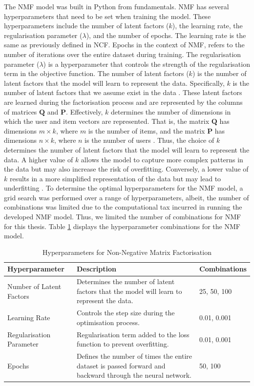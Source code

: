 The NMF model was built in Python from fundamentals. NMF has several hyperparameters that need to be set when training the model. These hyperparameters include the number of latent factors ($k$), the learning rate, the regularisation parameter ($\lambda$), and the number of epochs. The learning rate is the same as previously defined in NCF. Epochs in the context of NMF, refers to the number of iterations over the entire dataset during training. The regularisation parameter ($\lambda$) is a hyperparameter that controls the strength of the regularisation term in the objective function. The number of latent factors ($k$) is the number of latent factors that the model will learn to represent the data. Specifically, $k$ is the number of latent factors that we assume exist in the data \cite{lee2000algorithms}. These latent factors are learned during the factorisation process and are represented by the columns of matrices $\mathbf{Q}$ and $\mathbf{P}$. Effectively, $k$ determines the number of dimensions in which the user and item vectors are represented. That is, the matrix $\mathbf{Q}$ has dimensions $m \times k$, where $m$ is the number of items, and the matrix $\mathbf{P}$ has dimensions $n \times k$, where $n$ is the number of users \cite{zhang2006learning}. Thus, the choice of $k$ determines the number of latent factors that the model will learn to represent the data. A higher value of $k$ allows the model to capture more complex patterns in the data but may also increase the risk of overfitting. Conversely, a lower value of $k$ results in a more simplified representation of the data but may lead to underfitting \cite{zhang2006learning}. To determine the optimal hyperparameters for the NMF model, a grid search was performed over a range of hyperparameters, albeit, the number of combinations was limited due to the computational tax incurred in running the developed NMF model. Thus, we limited the number of combinations for NMF for this thesis. Table \ref{hyper_params_mf} displays the hyperparameter combinations for the NMF model.



\begin{table}[h]
    \centering
    \begin{tabular}{|p{5cm}|p{7cm}|p{3.5cm}|}
    \hline
    \textbf{Hyperparameter} & \textbf{Description}  & \textbf{Combinations} \\
    \hline
    Number of Latent Factors & Determines the number of latent factors that the model will learn to represent the data. & 25, 50, 100 \\
    Learning Rate & Controls the step size during the optimisation process. & 0.01, 0.001 \\
    Regularisation Parameter & Regularisation term added to the loss function to prevent overfitting. & 0.01, 0.001 \\
    Epochs & Defines the number of times the entire dataset is passed forward and backward through the neural network. & 50, 100 \\
    \hline
    \end{tabular}
    \caption{Hyperparameters for Non-Negative Matrix Factorisation}
    \label{hyper_params_mf}
    \end{table}

